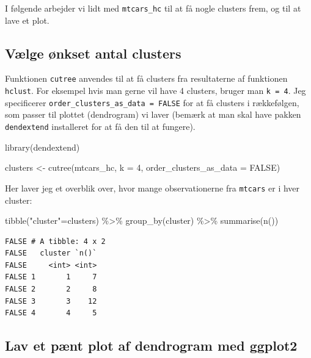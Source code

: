 \documentclass[
]{book}
\newenvironment{Shaded}{\begin{snugshade}}{\end{snugshade}}
\newcommand{\AttributeTok}[1]{\textcolor[rgb]{0.77,0.63,0.00}{#1}}
\newcommand{\ConstantTok}[1]{\textcolor[rgb]{0.00,0.00,0.00}{#1}}
\newcommand{\DecValTok}[1]{\textcolor[rgb]{0.00,0.00,0.81}{#1}}
\newcommand{\FunctionTok}[1]{\textcolor[rgb]{0.00,0.00,0.00}{#1}}
\newcommand{\NormalTok}[1]{#1}
\newcommand{\OtherTok}[1]{\textcolor[rgb]{0.56,0.35,0.01}{#1}}
\newcommand{\SpecialCharTok}[1]{\textcolor[rgb]{0.00,0.00,0.00}{#1}}
\newcommand{\StringTok}[1]{\textcolor[rgb]{0.31,0.60,0.02}{#1}}
\begin{document}
I følgende arbejder vi lidt med \texttt{mtcars\_hc} til at få nogle clusters frem, og til at lave et plot.

\hypertarget{vuxe6lge-uxf8nkset-antal-clusters}{%
\subsection{Vælge ønkset antal clusters}\label{vuxe6lge-uxf8nkset-antal-clusters}}

Funktionen \texttt{cutree} anvendes til at få clusters fra resultaterne af funktionen \texttt{hclust}. For eksempel hvis man gerne vil have 4 clusters, bruger man \texttt{k\ =\ 4}. Jeg specificerer \texttt{order\_clusters\_as\_data\ =\ FALSE} for at få clusters i rækkefølgen, som passer til plottet (dendrogram) vi laver (bemærk at man skal have pakken \texttt{dendextend} installeret for at få den til at fungere).

\begin{Shaded}
\begin{Highlighting}[]
\FunctionTok{library}\NormalTok{(dendextend)}

\NormalTok{clusters }\OtherTok{\textless{}{-}} \FunctionTok{cutree}\NormalTok{(mtcars\_hc, }\AttributeTok{k =} \DecValTok{4}\NormalTok{, }\AttributeTok{order\_clusters\_as\_data =} \ConstantTok{FALSE}\NormalTok{)}
\end{Highlighting}
\end{Shaded}

Her laver jeg et overblik over, hvor mange observationerne fra \texttt{mtcars} er i hver cluster:

\begin{Shaded}
\begin{Highlighting}[]
\FunctionTok{tibble}\NormalTok{(}\StringTok{"cluster"}\OtherTok{=}\NormalTok{clusters) }\SpecialCharTok{\%\textgreater{}\%} \FunctionTok{group\_by}\NormalTok{(cluster) }\SpecialCharTok{\%\textgreater{}\%} \FunctionTok{summarise}\NormalTok{(}\FunctionTok{n}\NormalTok{())}
\end{Highlighting}
\end{Shaded}

\begin{verbatim}
FALSE # A tibble: 4 x 2
FALSE   cluster `n()`
FALSE     <int> <int>
FALSE 1       1     7
FALSE 2       2     8
FALSE 3       3    12
FALSE 4       4     5
\end{verbatim}

\hypertarget{lav-et-puxe6nt-plot-af-dendrogram-med-ggplot2}{%
\subsection{Lav et pænt plot af dendrogram med ggplot2}\label{lav-et-puxe6nt-plot-af-dendrogram-med-ggplot2}}
\end{document}
